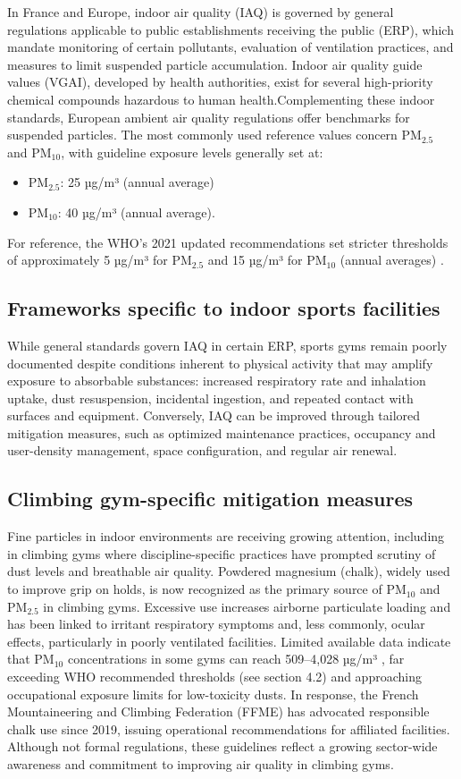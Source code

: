 \documentclass[pdflatex,sn-basic]{sn-jnl}%
\begin{document}
In France and Europe, indoor air quality (IAQ) is governed by general regulations applicable to public establishments receiving the public (ERP), which mandate monitoring of certain pollutants, evaluation of ventilation practices, and measures to limit suspended particle accumulation. Indoor air quality guide values (VGAI), developed by health authorities, exist for several high-priority chemical compounds hazardous to human health.Complementing these indoor standards, European ambient air quality regulations offer benchmarks for suspended particles. The most commonly used reference values concern PM$_{2.5}$ and PM$_{10}$, with guideline exposure levels generally set at:
\begin{itemize}
\item PM$_{2.5}$: 25 µg/m³ (annual average)
\item PM$_{10}$: 40 µg/m³ (annual average).
\end{itemize}
For reference, the WHO's 2021 updated recommendations set stricter thresholds of approximately 5 µg/m³ for PM$_{2.5}$ and 15 µg/m³ for PM$_{10}$ (annual averages) .

\subsection{Frameworks specific to indoor sports facilities}
\label{subsec12}

While general standards govern IAQ in certain ERP, sports gyms remain poorly documented despite conditions inherent to physical activity that may amplify exposure to absorbable substances: increased respiratory rate and inhalation uptake, dust resuspension, incidental ingestion, and repeated contact with surfaces and equipment. Conversely, IAQ can be improved through tailored mitigation measures, such as optimized maintenance practices, occupancy and user-density management, space configuration, and regular air renewal. 

\subsection{Climbing gym-specific mitigation measures}
\label{subsec13}

Fine particles in indoor environments are receiving growing attention, including in climbing gyms where discipline-specific practices have prompted scrutiny of dust levels and breathable air quality. Powdered magnesium (chalk), widely used to improve grip on holds, is now recognized as the primary source of PM$_{10}$ and PM$_{2.5}$ in climbing gyms. Excessive use increases airborne particulate loading and has been linked to irritant respiratory symptoms and, less commonly, ocular effects, particularly in poorly ventilated facilities. Limited available data indicate that PM$_{10}$ concentrations in some gyms can reach 509–4,028 µg/m³ , far exceeding WHO recommended thresholds (see section 4.2) and approaching occupational exposure limits for low-toxicity dusts. In response, the French Mountaineering and Climbing Federation (FFME) has advocated responsible chalk use since 2019, issuing operational recommendations for affiliated facilities. Although not formal regulations, these guidelines reflect a growing sector-wide awareness and commitment to improving air quality in climbing gyms.
\end{document}
